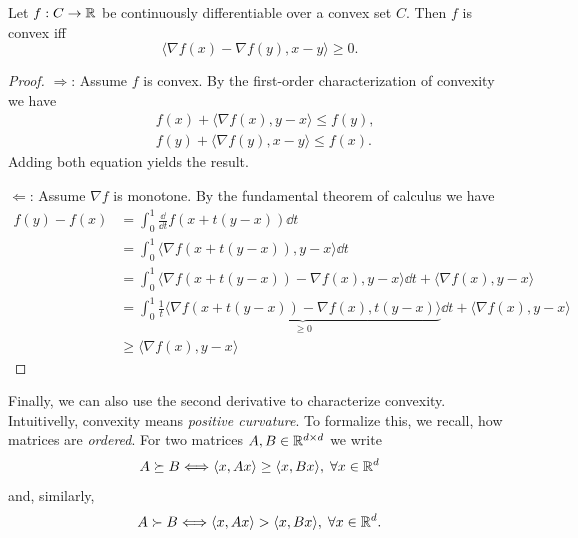 \begin{theorem}
    Let $f:C\rightarrow\mathbb{R}$ be continuously differentiable over a convex set $C$. Then $f$ is convex iff
    \begin{equation}
        \langle\nabla f(x) - \nabla f(y),x-y\rangle\geq 0.
    \end{equation}
\end{theorem}
\begin{proof}
    $\Rightarrow$: Assume $f$ is convex. By the first-order characterization of convexity we have 
    \begin{equation}
        \begin{aligned}
            &f(x) + \langle\nabla f(x), y-x\rangle\leq f(y),\\
            &f(y) + \langle\nabla f(y), x-y\rangle\leq f(x).
        \end{aligned}
    \end{equation}
    Adding both equation yields the result.

    $\Leftarrow$: Assume $\nabla f$ is monotone. By the fundamental theorem of calculus we have
    \begin{equation}
        \begin{aligned}
            f(y) - f(x) 
            &= \int_0^1 \frac{\dd}{\dd t}f(x+t(y-x))\dd t\\
            &= \int_0^1 \langle\nabla f(x+t(y-x)), y-x\rangle\dd t\\
            &= \int_0^1 \langle\nabla f(x+t(y-x))-\nabla f(x), y-x\rangle\dd t + \langle\nabla f(x), y-x\rangle\\
            &= \int_0^1 \frac{1}{t}\underbrace{\langle\nabla f(x+t(y-x))-\nabla f(x), t(y-x)\rangle}_{\geq 0}\dd t + \langle \nabla f(x), y-x\rangle\\
            &\geq \langle \nabla f(x), y-x\rangle
        \end{aligned}
    \end{equation}
\end{proof}

Finally, we can also use the second derivative to characterize convexity. Intuitivelly, convexity means \emph{positive curvature}. To formalize this, we recall, how matrices are \emph{ordered}. For two matrices $A,B\in \mathbb{R}^{d\times d}$ we write
\begin{equation}
    A\succeq B \Longleftrightarrow \langle x, A x\rangle \geq \langle x, B x\rangle,\; \forall x\in\mathbb{R}^d
\end{equation}
and, similarly,
\begin{equation}
    A\succ B \Longleftrightarrow \langle x, A x\rangle > \langle x, B x\rangle,\; \forall x\in\mathbb{R}^d.
\end{equation}

